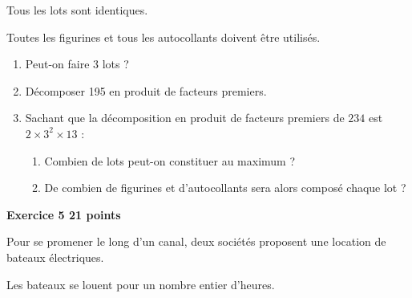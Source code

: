 \documentclass[11pt]{article}
\begin{document}
Tous les lots sont identiques.

Toutes les figurines et tous les autocollants doivent être utilisés.

\medskip

\begin{enumerate}
\item Peut-on faire 3 lots ?
\item Décomposer 195 en produit de facteurs premiers.
\item Sachant que la décomposition en produit de facteurs premiers de $234$ est $2 \times 3^2 \times 13$ :
	\begin{enumerate}
		\item Combien de lots peut-on constituer au maximum ?
		\item De combien de figurines et d'autocollants sera alors composé chaque lot ?
	\end{enumerate}
\end{enumerate}

\bigskip

\textbf{Exercice 5 \hfill 21 points}

\medskip

Pour se promener le long d'un canal, deux sociétés proposent une location de bateaux électriques.

Les bateaux se louent pour un nombre entier d'heures.

\medskip
\end{document}
